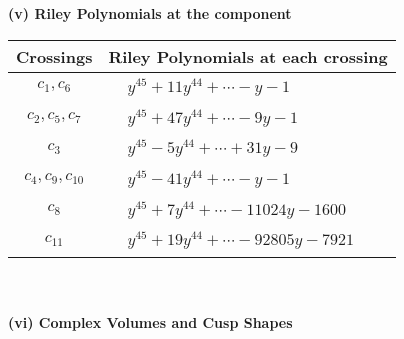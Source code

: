 \documentclass[1p]{elsarticle_modified}
\theoremstyle{definition}
\begin{document}
\newpage\renewcommand{\arraystretch}{1}
\flushleft \textbf{(v) Riley Polynomials at the component}\newline \\
\begin{tabular}{m{50pt}|m{274pt}}
Crossings & \hspace{64pt}Riley Polynomials at each crossing \\
\hline $$\begin{aligned}c_{1},c_{6}\end{aligned}$$&$\begin{aligned}
&y^{45}+11 y^{44}+\cdots- y-1
\end{aligned}$\\
\hline $$\begin{aligned}c_{2},c_{5},c_{7}\end{aligned}$$&$\begin{aligned}
&y^{45}+47 y^{44}+\cdots-9 y-1
\end{aligned}$\\
\hline $$\begin{aligned}c_{3}\end{aligned}$$&$\begin{aligned}
&y^{45}-5 y^{44}+\cdots+31 y-9
\end{aligned}$\\
\hline $$\begin{aligned}c_{4},c_{9},c_{10}\end{aligned}$$&$\begin{aligned}
&y^{45}-41 y^{44}+\cdots- y-1
\end{aligned}$\\
\hline $$\begin{aligned}c_{8}\end{aligned}$$&$\begin{aligned}
&y^{45}+7 y^{44}+\cdots-11024 y-1600
\end{aligned}$\\
\hline $$\begin{aligned}c_{11}\end{aligned}$$&$\begin{aligned}
&y^{45}+19 y^{44}+\cdots-92805 y-7921
\end{aligned}$\\
\hline
\end{tabular}\\~\\
\newpage\flushleft \textbf{(vi) Complex Volumes and Cusp Shapes}
\end{document}
